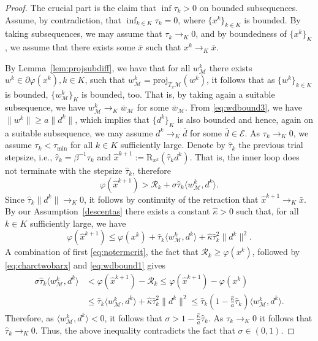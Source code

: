 \documentclass[a4paper, 12pt]{article}
\numberwithin{equation}{section}
\theoremstyle{bolddef}
\theoremstyle{definition}
\theoremstyle{boldplain}
\newcommand{\xk}{x^k}
\newcommand{\wk}{w^k}
\newcommand{\dk}{d^k}
\newcommand{\tauk}{\tau_k}
\newcommand{\xhkp}{{\hat x}^{k+1}}
\newcommand{\tauhk}{{\hat \tau}_k}
\newcommand{\taumin}{\tau_\mathrm{min}}
\newcommand{\X}{\mathcal{E}}
\newcommand{\Rvalue}{\mathcal{R}}
\newcommand{\proj}{\mathrm{proj}}
\newcommand{\retr}{\mathrm{R}}
\begin{document}
\begin{proof}
The crucial part is the claim that $\inf \tau_k > 0$ on bounded subsequences. Assume, by contradiction, that $\inf_{k \in K} \tau_k = 0$, where $\{\xk\}_{k \in K}$ is bounded. By taking subsequences, we may assume that $\tau_k \to_K 0$, and by boundedness of $\{\xk\}_K$, we assume that there exists some $\bar x$ such that $\xk \to_K \bar x$.

By Lemma~\ref{lem:projsubdiff}, we have that for all $\wk_\mathcal{M}$ there exists $\wk \in \partial \varphi(\xk), k \in K$, such that $\wk_\mathcal{M} = \proj_{T_x\mathcal{M}} (\wk)$, it follows that as $\{\wk\}_{k \in K}$ is bounded, $\{\wk_\mathcal{M}\}_K$ is bounded, too. That is, by taking again a suitable subsequence, we have $\wk_\mathcal{M} \to_K \bar w_\mathcal{M}$ for some $\bar w_\mathcal{M}$. From \eqref{eq:wdbound3}, we have $\| \wk \| \geq a \| \dk \|$, which implies that $\{ \dk\}_K$ is also bounded and hence, again on a suitable subsequence, we may assume $\dk \to_K \bar d$ for some $\bar d \in \X$. As $\tau_k \to_K 0$, we assume $\tauk < \taumin$ 
for all $k \in K$ sufficiently large. Denote by $\tauhk$ the previous 
trial stepsize, i.e., $\tauhk = \beta^{-1} \tauk$ and $\xhkp := \retr_{\xk}(\tauhk \dk)$. That is, the inner loop does not terminate with the stepsize $\tauhk$, therefore
\begin{equation}\label{eq:notermcrit}
	\varphi(\xhkp) > \Rvalue_k + \sigma \tauhk \langle \wk_\mathcal{M}, \dk \rangle.
\end{equation}
Since $ \tauhk \| \dk\| \to_K 0$, it follows by continuity of the retraction that $\xhkp \to_K \bar x$. By our Assumption~\ref{descentas} there exists a constant $\hat \kappa > 0$ such that, for all $k \in K$ sufficiently 
large, we have
\begin{equation}\label{eq:charctwobarx}
	\varphi(\xhkp) \leq \varphi(\xk) + \tauhk \langle \wk_\mathcal{M}, \dk \rangle + \hat \kappa \tauhk^2 \| \dk \|^2.
\end{equation}
A combination of first \eqref{eq:notermcrit}, the fact that $\Rvalue_k \geq \varphi(\xk)$, followed by \eqref{eq:charctwobarx} and \eqref{eq:wdbound1} gives
\begin{align*}
	\sigma \tauhk \langle \wk_\mathcal{M}, \dk \rangle & < \varphi(\xhkp) - \Rvalue_k  \leq \varphi(\xhkp) - \varphi(\xk)\\
		& \leq \tauhk \langle \wk_\mathcal{M}, \dk \rangle + \hat \kappa \tauhk^2 \|\dk\|^2
		 \leq \tauhk  \left( 1 - \frac{\hat \kappa}{a} \tauhk\right) \langle \wk_\mathcal{M}, \dk \rangle.
\end{align*}
Therefore, as $\langle \wk_\mathcal{M}, \dk \rangle < 0$, it follows that $\sigma > 1- \frac{\hat \kappa}{a} \tauhk$.
As $\tauk \to_K 0$ it follows that $\tauhk \to_K 0$. Thus, the above inequality contradicts the fact that $\sigma \in (0,1)$.


\end{proof}
\end{document}
